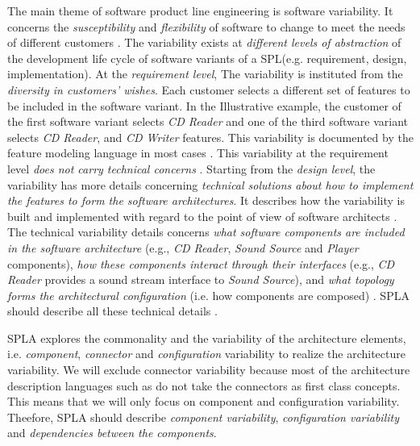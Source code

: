 \documentclass[graybox]{svmult}
\begin{document}
The main theme of software product line engineering is software variability. It concerns the \textit{susceptibility} and \textit{flexibility} of software to change to meet the needs of different customers \cite{1_clements2002}. The variability exists at \textit{different levels of abstraction} of the development life cycle of software variants of a SPL(e.g. requirement, design, implementation).
At the \textit{requirement level}, The variability is instituted from the \textit{diversity in customers' wishes}. Each customer selects a different set of features to be included in the software variant. In the Illustrative example, the customer of the first software variant selects \textit{CD Reader} and one of the third software variant selects \textit{CD Reader}, and \textit{CD Writer} features. This variability is documented by the feature modeling language in most cases \cite{7_kang1990feature}.  This variability at the requirement level \textit{does not carry technical concerns} \cite{3_pohl2005software}.  Starting from the\textit{ design level}, the variability has more details concerning \textit{technical solutions about how to implement the features to form the software architectures}. It describes how the variability is built and implemented with regard to the point of view of software architects \cite{3_pohl2005software}. The technical variability details concerns \textit{what software components are included in the software architecture} (e.g., \textit{CD Reader}, \textit{Sound Source} and \textit{Player} components), \textit{how these components interact through their interfaces} (e.g., \textit{CD Reader} provides a sound stream interface to \textit{Sound Source}), and \textit{what topology forms the architectural configuration} (i.e. how components are composed) \cite{nakagawa2011reference}. SPLA should describe all these technical details \cite{shatnawi2017recovering}. 

SPLA explores the commonality and the variability of the architecture elements, i.e. \textit{component}, \textit{connector} and \textit{configuration} variability to realize the architecture variability. We will exclude connector variability because most of the architecture description languages such as \cite{canal1999specification,luckham1996rapide,magee1996dynamic} do not take the connectors as first class concepts. This means that we will only focus on component and configuration variability. Theefore, SPLA should describe \textit{component variability}, \textit{configuration variability} and \textit{dependencies between the components}.
\end{document}

